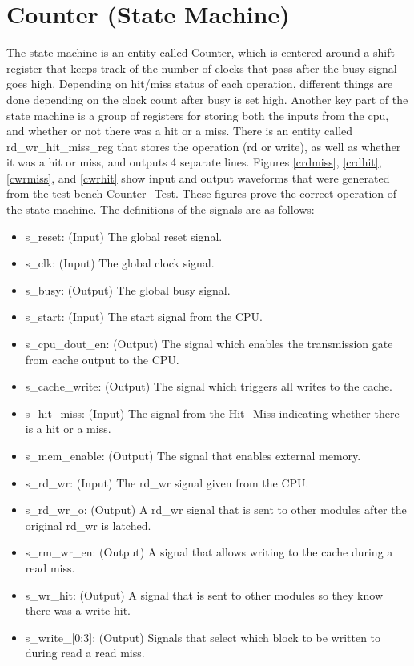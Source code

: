 \documentclass[10pt]{article}
\begin{document}
\section{Counter (State Machine)}
        The state machine is an entity called Counter, which is centered around
a shift register that keeps track of the number of clocks that pass after the
busy signal goes high. Depending on hit/miss status of each operation, different
things are done depending on the clock count after busy is set high. Another key
part of the state machine is a group of registers for storing both the inputs
from the cpu, and whether or not there was a hit or a miss. There is an entity
called rd_wr_hit_miss_reg that stores the operation (rd or write), as well as
whether it was a hit or miss, and outputs 4 separate lines. Figures
\ref{crdmiss}, \ref{crdhit}, \ref{cwrmiss}, and \ref{cwrhit} show input and
output waveforms that were generated from the test bench Counter_Test. These
figures prove the correct operation of the state machine. The definitions of the
signals are as follows:
\begin{itemize}
    \item s_reset: (Input) The global reset signal.
    \item s_clk: (Input) The global clock signal.
    \item s_busy: (Output) The global busy signal.
    \item s_start: (Input) The start signal from the CPU.
    \item s_cpu_dout_en: (Output) The signal which enables the transmission gate
from cache output to the CPU.
    \item s_cache_write: (Output) The signal which triggers all writes to the
cache.
    \item s_hit_miss: (Input) The signal from the Hit_Miss indicating whether
there is a hit or a miss.
    \item s_mem_enable: (Output) The signal that enables external memory.
    \item s_rd_wr: (Input) The rd_wr signal given from the CPU.
    \item s_rd_wr_o: (Output) A rd_wr signal that is sent to other modules after
the original rd_wr is latched.
    \item s_rm_wr_en: (Output) A signal that allows writing to the cache during
a read miss.
    \item s_wr_hit: (Output) A signal that is sent to other modules so they know
there was a write hit.
    \item s_write_[0:3]: (Output) Signals that select which block to be written
to during read a read miss.
\end{itemize} 
\end{document}
